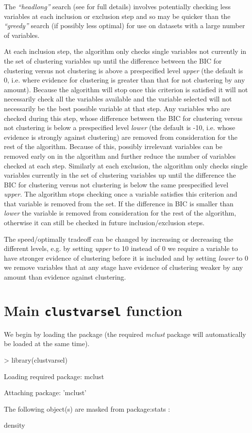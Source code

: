 \documentclass[,12pt]{article}
\newcommand{\Rfunction}[1]{{\texttt{#1}}}
\newcommand{\Rpackage}[1]{{\textit{#1}}}
\newcommand{\Rfunarg}[1]{{\textit{#1}}}
\begin{document}
The \Rfunarg{``headlong''} search (see  for full details) involves potentially checking less variables at each inclusion or exclusion step and so may be quicker than the \Rfunarg{``greedy''} search (if possibly less optimal) for use on datasets with a large number of variables. 

At each inclusion step, the algorithm only checks single variables not currently in the set of clustering variables up until the difference between the BIC for clustering versus not clustering is above a prespecified level \Rfunarg{upper} (the default is 0, i.e. where evidence for clustering is greater than that for not clustering by any amount). Because the algorithm will stop once this criterion is satisfied it will not necessarily check all the variables available and the variable selected will not necessarily be the best possible variable at that step. Any variables who are checked during this step, whose difference between the BIC for clustering versus not clustering is below a prespecified level \Rfunarg{lower} (the default is -10, i.e. whose evidence is strongly against clustering) are removed from consideration for the rest of the algorithm. Because of this, possibly irrelevant variables can be removed early on in the algorithm and further reduce the number of variables checked at each step. Similarly at each exclusion, the algorithm only checks single variables currently in the set of clustering variables up until the difference the BIC for clustering versus not clustering is below the same prespecified level \Rfunarg{upper}. The algorithm stops checking once a variable satisfies this criterion and that variable is removed from the set. If the difference in BIC is smaller than \Rfunarg{lower} the variable is removed from consideration for the rest of the algorithm, otherwise it can still be checked in future inclusion/exclusion steps. 

The speed/optimally tradeoff can be changed by increasing or decreasing the different levels, e.g. by setting \Rfunarg{upper} to 10 instead of 0 we require a variable to have stronger evidence of clustering before it is included and by setting \Rfunarg{lower} to 0 we remove variables that at any stage have evidence of clustering weaker by any amount than evidence against clustering.

\section{Main \Rfunction{clustvarsel} function}
We begin by loading the package (the required \Rpackage{mclust} package will automatically be loaded at the same time).
\begin{Schunk}
\begin{Sinput}
> library(clustvarsel)
\end{Sinput}
\begin{Soutput}
Loading required package: mclust

Attaching package: 'mclust'


	The following object(s) are masked from package:stats :

	 density 


\end{Soutput}
\end{Schunk}
\end{document}
